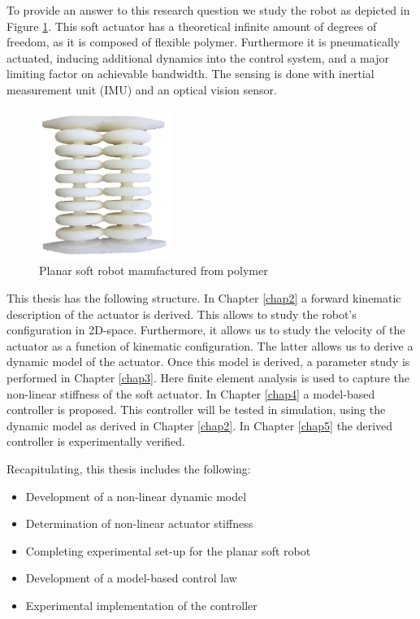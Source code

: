 To provide an answer to this research question we study the robot as depicted in Figure \ref{fig1:actuator}. This soft actuator has a theoretical infinite amount of degrees of freedom, as it is composed of flexible polymer. Furthermore it is pneumatically actuated, inducing additional dynamics into the control system, and a major limiting factor on achievable bandwidth. The sensing is done with inertial measurement unit (IMU) and an optical vision sensor. 

\begin{figure}[H]
    \centering
    \includegraphics[width = 
   0.38\textwidth]{Figures/Chapter1/actuator.png}
    \caption{Planar soft robot manufactured from polymer}
    \label{fig1:actuator}
\end{figure}

This thesis has the following structure. In Chapter \ref{chap2} a forward kinematic description of the actuator is derived. This allows to study the robot's configuration in 2D-space. Furthermore, it allows us to study the velocity of the actuator as a function of kinematic configuration. The latter allows us to derive a dynamic model of the actuator. Once this model is derived, a parameter study is performed in Chapter \ref{chap3}. Here finite element analysis is used to capture the non-linear stiffness of the soft actuator. In Chapter \ref{chap4} a model-based controller 
is proposed. This controller will be tested in simulation, using the dynamic model as derived in Chapter \ref{chap2}. In Chapter \ref{chap5} the derived controller is experimentally verified. 

Recapitulating, this thesis includes the following:


\begin{itemize}
    \item Development of a non-linear dynamic model
    \item Determination of non-linear actuator stiffness
    \item Completing experimental set-up for the planar soft robot 
    \item Development of a model-based control law
    \item Experimental implementation of the controller
\end{itemize}

